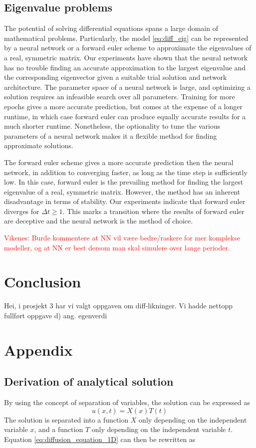 \documentclass[12pt]{extarticle}
\begin{document}
\subsection{Eigenvalue problems}
The potential of solving differential equations spans a large domain of mathematical problems. Particularly, the model \eqref{eq:diff_eig} can be represented by a neural network or a forward euler scheme to approximate the eigenvalues of a real, symmetric matrix. Our experiments have shown that the neural network has no trouble finding an accurate approximation to the largest eigenvalue and the corresponding eigenvector given a suitable trial solution and network architecture. The parameter space of a neural network is large, and optimizing a solution requires an infeasible search over all parameters. Training for more epochs gives a more accurate prediction, but comes at the expense of a longer runtime, in which case forward euler can produce equally accurate results for a much shorter runtime. Nonetheless, the optionality to tune the various parameters of a neural network makes it a flexible method for finding approximate solutions.

The forward euler scheme gives a more accurate prediction then the neural network, in addition to converging faster, as long as the time step is sufficiently low. In this case, forward euler is the prevailing method for finding the largest eigenvalue of a real, symmetric matrix. However, the method has an inherent disadvantage in terms of stability. Our experiments indicate that forward euler diverges for $\Delta t \ge 1$. This marks a transition where the results of forward euler are deceptive and the neural network is the method of choice.

\textcolor{red}{Vikenes: Burde kommentere at NN vil være bedre/raskere for mer komplekse modeller, og at NN er best dersom man skal simulere over lange perioder.}



\section{Conclusion}
Hei, i prosjekt 3 har vi valgt oppgaven om diff-likninger.
Vi hadde nettopp fullført oppgave d) ang. egenverdi

\section{Appendix}

\subsection{Derivation of analytical solution}
By using the concept of separation of variables, the solution can be expressed as
\[ u(x,t) = X(x)T(t) \]
The solution is separated into a function $X$ only depending on the independent variable $x$, and a function $T$ only depending on the independent variable $t$. Equation \eqref{eq:diffusion_equation_1D} can then be rewritten as
\end{document}
